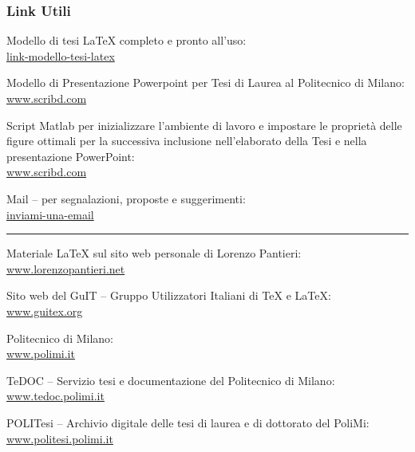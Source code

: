 \subsubsection{Link Utili}
%
\noindent Modello di tesi \LaTeX{} completo e pronto all'uso: \\
\href{http://bit.ly/1id0dtK}{link-modello-tesi-latex}

\medskip
%
\noindent Modello di Presentazione Powerpoint per Tesi di Laurea al Politecnico di Milano: \\
\href{http://www.scribd.com/doc/221624236/Modello-PPT-per-Tesi}{www.scribd.com}

\medskip
%
\noindent Script Matlab per inizializzare l'ambiente di lavoro e impostare le proprietà delle figure ottimali per la successiva inclusione nell'elaborato della Tesi e nella presentazione PowerPoint: \\
\href{http://www.scribd.com/doc/221576068/Script-Matlab-per-Tesi}{www.scribd.com}

\medskip
%
\noindent Mail -- per segnalazioni, proposte e suggerimenti: \\
\href{mailto:luca.maggiori@mail.polimi.it}{inviami-una-email}

\noindent \rule{0.4\textwidth}{.4pt}

\medskip
%
\noindent Materiale \LaTeX{} sul sito web personale di Lorenzo Pantieri: \\
\href{http://www.lorenzopantieri.net/LaTeX.html}{www.lorenzopantieri.net}

\medskip
%
\noindent Sito web del GuIT -- Gruppo Utilizzatori Italiani di \TeX{} e \LaTeX{}: \\
\href{http://www.guitex.org/home/}{www.guitex.org}

\medskip
%
\noindent Politecnico di Milano: \\
\href{http://www.polimi.it/}{www.polimi.it}

\medskip
%
\noindent TeDOC -- Servizio tesi e documentazione del Politecnico di Milano: \\
\href{http://www.tedoc.polimi.it/}{www.tedoc.polimi.it}

\medskip
%
\noindent POLITesi -- Archivio digitale delle tesi di laurea e di dottorato del PoliMi: \\
\href{https://www.politesi.polimi.it/}{www.politesi.polimi.it}
%
